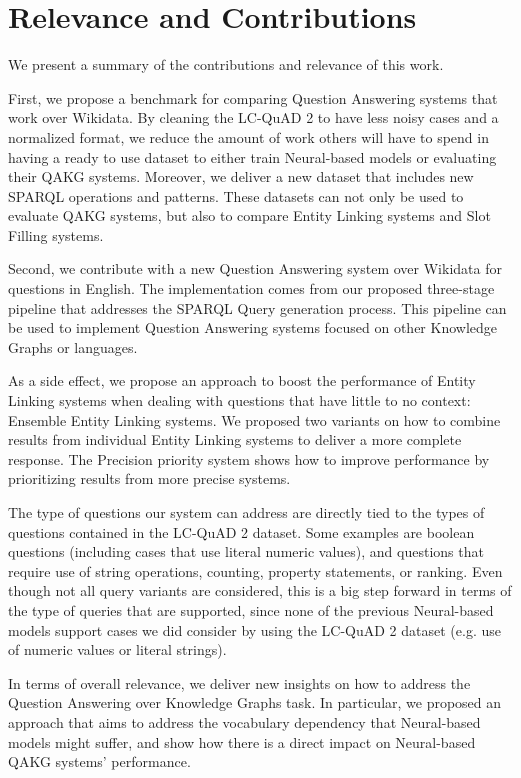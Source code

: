 \section{Relevance and Contributions}
\label{cap6:conclusions/relevanceContributions}
We present a summary of the contributions and relevance of this work.

First, we propose a benchmark for comparing Question Answering systems that work over Wikidata. By 
cleaning the LC-QuAD 2 to have less noisy cases and a normalized format, we reduce the amount of 
work others will have to spend in having a ready to use dataset to either train Neural-based models 
or evaluating their QAKG systems. Moreover, we deliver a new dataset that includes new SPARQL 
operations and patterns. These datasets can not only be used to evaluate QAKG systems, but also to 
compare Entity Linking systems and Slot Filling systems.

Second, we contribute with a new Question Answering system over Wikidata for questions in English. 
The implementation comes from our proposed three-stage pipeline that addresses the SPARQL Query 
generation process. This pipeline can be used to implement Question Answering systems focused on 
other Knowledge Graphs or languages. 

As a side effect, we propose an approach to boost the performance of Entity Linking systems when 
dealing with questions that have little to no context: Ensemble Entity Linking systems. We proposed 
two variants on how to combine results from individual Entity Linking systems to deliver a more 
complete response. The Precision priority system shows how to improve performance by prioritizing 
results from more precise systems. 

The type of questions our system can address are directly tied to the types of questions contained in 
the LC-QuAD 2 dataset. Some examples are boolean questions (including cases that use literal numeric 
values), and questions that require use of string operations, counting, property statements, or 
ranking. Even though not all query variants are considered, this is a big step forward in terms of 
the type of queries that are supported, since none of the previous Neural-based models support cases 
we did consider by using the LC-QuAD 2 dataset (e.g. use of numeric values or literal strings). 

In terms of overall relevance, we deliver new insights on how to address the Question Answering over 
Knowledge Graphs task. In particular, we proposed an approach that aims to address the vocabulary 
dependency that Neural-based models might suffer, and show how there is a direct impact on 
Neural-based QAKG systems’ performance. 

